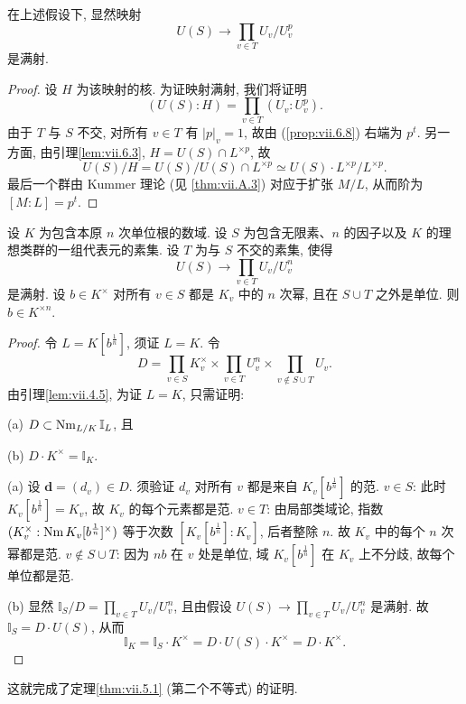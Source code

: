\begin{lemma}\label{lem:vii.6.9}
在上述假设下, 显然映射
\[
U(S)\to\prod_{v\in T}U_{v}/U_{v}^{p}
\]
是满射.
\end{lemma}

\begin{proof}
设 $H$ 为该映射的核. 为证映射满射, 我们将证明
\[
(U(S):H)=\prod_{v\in T}(U_{v}:U_{v}^{p}).
\]
由于 $T$ 与 $S$ 不交, 对所有 $v\in T$ 有 $|p|_{v}=1$, 故由 (\ref{prop:vii.6.8}) 右端为 $p^{t}$. 另一方面, 由引理\ref{lem:vii.6.3}, $H=U(S)\cap L^{\times p}$, 故
\[
U(S)/H=U(S)/U(S)\cap L^{\times p}\simeq U(S)\cdot L^{\times p}/L^{\times p}.
\]
最后一个群由 Kummer 理论 (见 \ref{thm:vii.A.3}) 对应于扩张 $M/L$, 从而阶为 $[M:L]=p^{t}$.
\end{proof}

\begin{proposition}\label{prop:vii.6.10}
设 $K$ 为包含本原 $n$ 次单位根的数域. 设 $S$ 为包含无限素、$n$ 的因子以及 $K$ 的理想类群的一组代表元的素集. 设 $T$ 为与 $S$ 不交的素集, 使得
\[
U(S)\to\prod_{v\in T}U_{v}/U_{v}^{n}
\]
是满射. 设 $b\in K^{\times}$ 对所有 $v\in S$ 都是 $K_v$ 中的 $n$ 次幂, 且在 $S\cup T$ 之外是单位. 则 $b\in K^{\times n}$.
\end{proposition}

\begin{proof}
令 $L=K[b^{\frac{1}{n}}]$, 须证 $L=K$. 令
\[
D=\prod_{v\in S}K_{v}^{\times}\times\prod_{v\in T}U_{v}^{n}\times\prod_{v\notin S\cup T}U_{v}.
\]
由引理\ref{lem:vii.4.5}, 为证 $L=K$, 只需证明:

(a) $D\subset\operatorname{Nm}_{L/K}\mathbb{I}_L$, 且

(b) $D\cdot K^{\times}=\mathbb{I}_K$.

(a) 设 $\mathbf{d}=(d_v)\in D$. 须验证 $d_v$ 对所有 $v$ 都是来自 $K_v[b^{\frac{1}{n}}]$ 的范. $v\in S$: 此时 $K_v[b^{\frac{1}{n}}]=K_v$, 故 $K_v$ 的每个元素都是范. $v\in T$: 由局部类域论, 指数 $(K_{v}^{\times}:\operatorname{Nm} K_{v}[b^{\frac{1}{n}}]^{\times})$ 等于次数 $[K_v[b^{\frac{1}{n}}]:K_v]$, 后者整除 $n$. 故 $K_v$ 中的每个 $n$ 次幂都是范. $v\notin S\cup T$: 因为 $nb$ 在 $v$ 处是单位, 域 $K_v[b^{\frac{1}{n}}]$ 在 $K_v$ 上不分歧, 故每个单位都是范.

(b) 显然 $\mathbb{I}_S/D=\prod_{v\in T}U_v/U_v^{n}$, 且由假设 $U(S)\to\prod_{v\in T}U_v/U_v^{n}$ 是满射. 故 $\mathbb{I}_S=D\cdot U(S)$, 从而
\[
\mathbb{I}_{K}=\mathbb{I}_{S}\cdot K^{\times}=D\cdot U(S)\cdot K^{\times}=D\cdot K^{\times}.
\]
\end{proof}

这就完成了定理\ref{thm:vii.5.1} (第二个不等式) 的证明.


